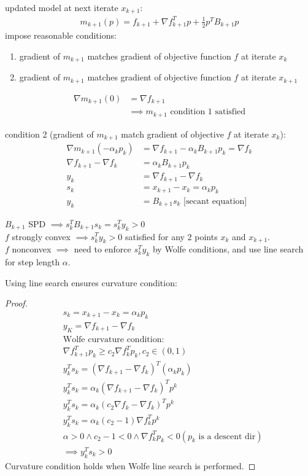 \documentclass[8pt,letter]{article}
\begin{document}
\begin{multicols*}{2}
  updated model at next iterate $x_{k+1}$:
  \begin{align*}
    m_{k+1}(p)=f_{k+1} + \nabla f_{k+1}^T p + \frac{1}{2} p^T B_{k+1} p
  \end{align*}
  impose reasonable conditions:
  \begin{enumerate}
  \item gradient of $m_{k+1}$ matches gradient of objective function $f$ at iterate $x_k$
  \item gradient of $m_{k+1}$ matches gradient of objective function $f$ at iterate $x_{k+1}$
  \end{enumerate}
  \begin{align*}
    \nabla m_{k+1}(0) & = \nabla f_{k+1} \\
    & \implies m_{k+1} \text{ condition 1 satisfied}
  \end{align*}

  condition 2 (gradient of $m_{k+1}$ match gradient of objective $f$ at iterate $x_k$):
  \begin{align*}
    \nabla m_{k+1}(-\alpha_k p_k) &= \nabla f_{k+1} - \alpha_k B_{k+1} p_k = \nabla f_k\\
    \nabla f_{k+1} - \nabla f_k &= \alpha_k B_{k+1} p_k\\
    y_k &= \nabla f_{k+1} - \nabla f_k\\
    s_k &= x_{k+1} - x_k = \alpha_k p_k\\
    y_k &= B_{k+1} s_k \text{ [secant equation]}
  \end{align*}

  $B_{k+1}$ SPD $\implies s_k^T B_{k+1} s_k = s_k^T y_k > 0$\\
  $f$ strongly convex $\implies s_k^T y_k > 0$ satisfied for any 2 points $x_k$ and $x_{k+1}$.\\
  $f$ nonconvex $\implies$ need to enforce $s_k^T y_k$ by Wolfe conditions, and use line search for step length $\alpha$.
  
  Using line search ensures curvature condition:
  \begin{proof}
    \begin{align*}
      &s_k=x_{k+1} - x_k = \alpha_k p_k\\
      &y_K = \nabla f_{k+1} - \nabla f_k\\
      &\text{Wolfe curvature condition:}\\
      &\nabla f_{k+1}^T p_k \geq c_2 \nabla f_k^T p_k, c_2 \in (0,1)\\
      &y_k^T s_k = (\nabla f_{k+1} - \nabla f_k)^T (\alpha_k p_k)\\
      &y_k^T s_k = \alpha_k (\nabla f_{k+1} - \nabla f_k)^T p^k\\
      &y_k^T s_k = \alpha_k (c_2 \nabla f_k - \nabla f_k)^T p^k\\
      &y_k^T s_k = \alpha_k (c_2-1) \nabla f_k^T p^k\\
      &\alpha > 0 \wedge c_2-1 < 0 \wedge \nabla f_k^T p_k < 0 (p_k \text{ is a descent dir})\\
      &\implies y_k^T s_k > 0
    \end{align*}
    Curvature condition holds when Wolfe line search is performed.
  \end{proof}


\end{multicols*}
\end{document}
